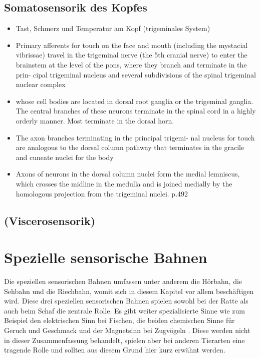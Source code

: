 \documentclass[12pt,a4paper,pdftex]{article}
\begin{document}
\subsection{Somatosensorik des Kopfes}
\label{sec:somatokopf}
\begin{itemize}
    \item Tast, Schmerz und Temperatur am Kopf (trigeminales System)
    \item Primary
afferents for touch on the face and mouth (including the
mystacial vibrissae) travel in the trigeminal nerve (the 5th cranial nerve) to enter the brainstem at the level of
the pons, where they branch and terminate in the prin-
cipal trigeminal nucleus and several subdivisions of the
spinal trigeminal nuclear complex \cite{paxinos2014rat}
\item whose cell bodies are located in dorsal root
    ganglia or the trigeminal ganglia. The central branches
    of these neurons terminate in the spinal cord in a highly
    orderly manner. Most terminate in the dorsal horn. \cite{kandel2013principles}
\item The axon branches terminating in the principal trigemi-
nal nucleus for touch are analogous to the dorsal column
pathway that terminates in the gracile and cuneate nuclei
for the body \cite{paxinos2014rat}

    \item Axons of neurons in the dorsal column nuclei form the medial lemniscus, which crosses the midline in the medulla and is joined medially by the homologous projection from the trigeminal nuclei. \cite{kandel2013principles} p.492
\end{itemize}
\subsection{(Viscerosensorik)}

\newpage
\section{Spezielle sensorische Bahnen}
\label{sec:spezsens}
Die speziellen sensorischen Bahnen umfassen unter anderem die Hörbahn, die Sehbahn und die Riechbahn, womit sich in diesem Kapitel vor allem beschäftigen wird. Diese drei speziellen sensorischen Bahnen spielen sowohl bei der Ratte als auch beim Schaf die zentrale Rolle. Es gibt weiter spezialisierte Sinne wie zum Beispiel den elektrischen Sinn bei Fischen, die beiden chemischen Sinne für Geruch und Geschmack und der Magnetsinn bei Zugvögeln \cite{smith2008biology}. Diese werden nicht in dieser Zusammenfassung behandelt, spielen aber bei anderen Tierarten eine tragende Rolle und sollten aus diesem Grund hier kurz erwähnt werden.
\end{document}
